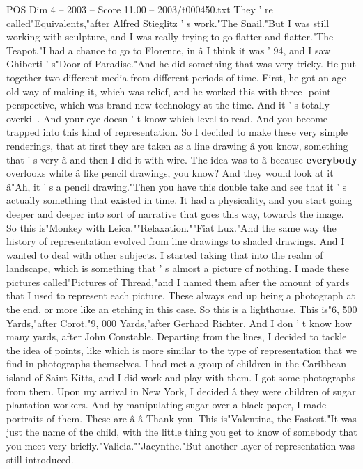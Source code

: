 \begin{textsample}{POS Dim 4 – 2003 – Score 11.00 – 2003/t000450.txt}
They ' re called"Equivalents,"after Alfred Stieglitz ' s work."The Snail."But I was still working with sculpture, and I was really trying to go flatter and flatter."The Teapot."I had a chance to go to Florence, in â I think it was ' 94, and I saw Ghiberti ' s"Door of Paradise."And he did something that was very tricky.
He put together two different media from different periods of time.
First, he got an age-old way of making it, which was relief, and he worked this with three- point perspective, which was brand-new technology at the time.
And it ' s totally overkill.
And your eye doesn ' t know which level to read.
And you become trapped into this kind of representation.
So I decided to make these very simple renderings, that at first they are taken as a line drawing â you know, something that ' s very â and then I did it with wire.
The idea was to â because \textbf{everybody} overlooks white â like pencil drawings, you know?
And they would look at it â"Ah, it ' s a pencil drawing."Then you have this double take and see that it ' s actually something that existed in time.
It had a physicality, and you start going deeper and deeper into sort of narrative that goes this way, towards the image.
So this is"Monkey with Leica.""Relaxation.""Fiat Lux."And the same way the history of representation evolved from line drawings to shaded drawings.
And I wanted to deal with other subjects.
I started taking that into the realm of landscape, which is something that ' s almost a picture of nothing.
I made these pictures called"Pictures of Thread,"and I named them after the amount of yards that I used to represent each picture.
These always end up being a photograph at the end, or more like an etching in this case.
So this is a lighthouse.
This is"6, 500 Yards,"after Corot."9, 000 Yards,"after Gerhard Richter.
And I don ' t know how many yards, after John Constable.
Departing from the lines, I decided to tackle the idea of points, like which is more similar to the type of representation that we find in photographs themselves.
I had met a group of children in the Caribbean island of Saint Kitts, and I did work and play with them.
I got some photographs from them.
Upon my arrival in New York, I decided â they were children of sugar plantation workers.
And by manipulating sugar over a black paper, I made portraits of them.
These are â â Thank you.
This is"Valentina, the Fastest."It was just the name of the child, with the little thing you get to know of somebody that you meet very briefly."Valicia.""Jacynthe."But another layer of representation was still introduced.

\end{textsample}
